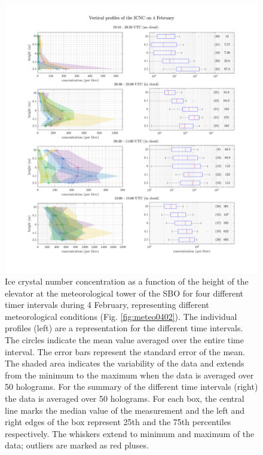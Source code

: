 \documentclass[draft,linenumbers]{agujournal}
\begin{document}
\begin{figure}[h]
 \centering
 	\includegraphics[width=14cm]{0402_Overview.png}
 \caption{Ice crystal number concentration as a function of the height of the elevator at the meteorological tower of the SBO for four different timer intervals during 4 February, representing different meteorological conditions (Fig. \ref{fig:meteo0402}). The individual profiles (left) are a representation for the different time intervals. The circles indicate the mean value averaged over the entire time interval. The error bars represent the standard error of the mean. The shaded area indicates the variability of the data and extends from the minimum to the maximum when the data is averaged over 50 holograms. For the summary of the different time intervals (right) the data is averaged over 50 holograms. For each box, the central line marks the median value of the measurement and the left and right edges of the box represent 25th and the 75th percentiles respectively. The whiskers extend to minimum and maximum of the data; outliers are marked as red pluses.}
 \label{fig:profiles0402}
\end{figure}
\end{document}
